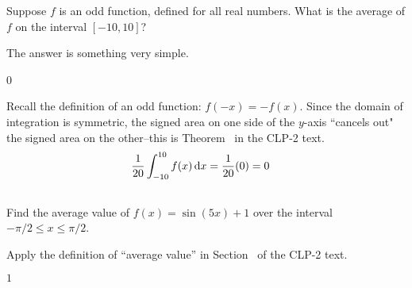 \begin{question}
Suppose $f$ is an odd function, defined for all real numbers. What is the average of $f$ on the interval $[-10,10]$?
\end{question}
\begin{hint}
The answer is something very simple.
\end{hint}
\begin{answer}
0
\end{answer}
\begin{solution}
Recall the definition of an odd function: $f(-x)=-f(x)$. Since the domain of integration is symmetric, the signed area on one side of the $y$-axis ``cancels out" the signed area on the other--this is Theorem~ in the CLP-2 text.
\begin{align*}\frac{1}{20}\int_{-10}^{10}f(x)\,\mathrm{d}x&=\frac{1}{20}(0)=0
\end{align*}
\end{solution}



\subsection*{\Procedural}

\begin{Mquestion}[2016Q3]
Find the average value of $f(x) = \sin(5x)+1$ over the interval $-\pi/2 \le x \le \pi/2 $.
\end{Mquestion}

\begin{hint}
Apply the definition of ``average value'' in Section~ of the
CLP-2 text.
\end{hint}

\begin{answer}
$1$
\end{answer}

